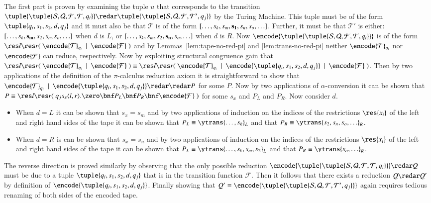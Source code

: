 \documentclass[submission,copyright,creativecommons]{eptcs}
\def\BNF{\ \  | \ \  }
\newenvironment{proof}[1][Proof]{\begin{trivlist}
\item[\hskip \labelsep {\bfseries #1}]}{\end{trivlist}}
\newcommand{\tmach}[1]{\tuple{\tuple{#1}}}
\newcommand{\tape}[1]{[#1]}
\begin{document}
\begin{proof}
The first part is proven by examining the tuple $u$ that corresponds to the transition 
$\tmach{{\mathcal S}, {\mathcal Q}, {\mathcal F}, {\mathcal T}, q_i}\redar
\tmach{{\mathcal S}, {\mathcal Q}, {\mathcal F}, {\mathcal T}', q_j}$
by the Turing Machine. This tuple must be of the form
$\tuple{q_i,s_1,s_2,d,q_j}$ and it must also be that ${\mathcal T}$ is of the form
$\tape{\ldots,s_k,s_m,{\bf s_1},s_n,s_o,\ldots}$.
Further, it must be that ${\mathcal T}'$ is either:
$\tape{\ldots,s_k,{\bf s_m},s_2,s_n,s_o,\ldots}$ when $d$ is $L$, or
$\tape{\ldots,s_k,s_m,s_2,{\bf s_n},s_o,\ldots}$ when $d$ is $R$.
Now $\encode{\tmach{{\mathcal S}, {\mathcal Q}, {\mathcal F}, {\mathcal T}, q_i}}$
is of the form
$\res l\res r(\ \encode {\mathcal T}_{q_i}\BNF \encode{\mathcal F}\ )$ and
by Lemmas~\ref{lem:tape-no-red-pi} and \ref{lem:trans-no-red-pi} neither $\encode {\mathcal T}_{q_i}$
nor $\encode{\mathcal F}$ can reduce, respectively.
Now by exploiting structural congruence gain that
$\res l\res r(\ \encode {\mathcal T}_{q_i} \BNF \encode{\mathcal F}\ )
\equiv
\res l\res r(\ \encode {\mathcal T}_{q_i} \BNF \encode {\tuple{q_i,s_1,s_2,d,q_j}}
\BNF \encode{\mathcal F}\ )$.
Then by two applications of the definition of the $\pi$-calculus reduction axiom 
it is straightforward to show that
$\encode {\mathcal T}_{q_i} \BNF \encode {\tuple{q_i,s_1,s_2,d,q_j}}\redar\redar
P$ for some $P$.
Now by two applications of $\alpha$-conversion it can be shown that
$P\equiv \res l \res r (\ q_j s_x\langle l, r\rangle.\zero \bnf P_L\bnf P_R\bnf \encode{\mathcal F} \ )$
for some $s_x$ and $P_L$ and $P_R$.
Now consider $d$.
\begin{itemize}
\item When $d=L$ it can be shown that $s_x=s_m$ and by two applications of induction on the
  indices of the restrictions $\res {x_i}$ of the left and right hand sides of the tape it can be shown
  that $P_L\equiv \ytrans {\ldots,s_k} _L$ and that $P_R\equiv \ytrans {s_2,s_n,s_o,\ldots} _R$.
\item When $d=R$ is can be shown that $s_x=s_n$ and by two applications of induction on the
  indices of the restrictions $\res {x_i}$ of the left and right hand sides of the tape it can be shown
  that $P_L\equiv \ytrans {\ldots,s_k,s_m,s_2} _L$ and that $P_R\equiv \ytrans {s_o,\ldots} _R$.
\end{itemize}

The reverse direction is proved similarly by observing that the only possible reduction
$\encode{\tmach{{\mathcal S}, {\mathcal Q}, {\mathcal F}, {\mathcal T}, q_i}}\redar Q$
must be due to a tuple $\tuple{q_i,s_1,s_2,d,q_j}$ that is in the transition function ${\mathcal F}$.
Then it follows that there exists a reduction $Q\redar Q'$ by definition of
$\encode {\tuple{q_i,s_1,s_2,d,q_j}}$.
Finally showing that $Q'\equiv\encode{\tmach{{\mathcal S}, {\mathcal Q}, {\mathcal F}, {\mathcal T}', q_j}}$
again requires tedious renaming of both sides of the encoded tape.
\end{proof}
\end{document}
